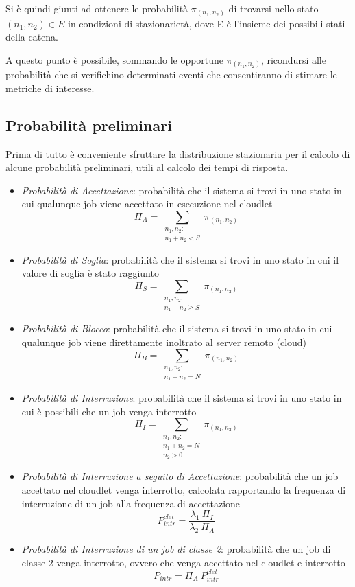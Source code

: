 Si è quindi giunti ad ottenere le probabilità $\pi_{(n_1,n_2)}$ di trovarsi
nello stato $(n_1, n_2) \in E$ in condizioni di stazionarietà, dove E è
l'insieme dei possibili stati della catena.

A questo punto è possibile, sommando le opportune $\pi_{(n_1,n_2)}$, ricondursi
alle probabilità che si verifichino determinati eventi che consentiranno di
stimare le metriche di interesse.
%
%
\subsection{Probabilità preliminari}
Prima di tutto è conveniente sfruttare la distribuzione stazionaria per il
calcolo di alcune probabilità preliminari, utili al calcolo dei tempi di
risposta.
\begin{itemize}
\item \emph{Probabilità di Accettazione}: probabilità che il sistema si trovi in
uno stato in cui qualunque job viene accettato in esecuzione nel cloudlet
\begin{equation}
\Pi_A = \sum_{\substack{n_1,n_2:\\n_1 + n_2 < S}} \pi_{(n_1,n_2)}
\end{equation}
\item \emph{Probabilità di Soglia}: probabilità che il sistema si trovi in uno
stato in cui il valore di soglia è stato raggiunto
\begin{equation}
\Pi_S = \sum_{\substack{n_1,n_2:\\ n_1 + n_2 \geq S}} \pi_{(n_1,n_2)}
\end{equation}
\item \emph{Probabilità di Blocco}: probabilità che il sistema si trovi in uno
stato in cui qualunque job viene direttamente inoltrato al server remoto (cloud)
\begin{equation}
\Pi_B = \sum_{\substack{n_1,n_2:\\n_1 + n_2 = N}} \pi_{(n_1,n_2)}
\end{equation}
\item \emph{Probabilità di Interruzione}: probabilità che il sistema si trovi in
uno stato in cui è possibili che un job venga interrotto
\begin{equation}
\Pi_I = \sum_{\substack{n_1,n_2:\\n_1 + n_2 = N\\n_2 > 0}} \pi_{(n_1,n_2)}
\end{equation}
\item \emph{Probabilità di Interruzione a seguito di Accettazione}: probabilità
che un job accettato nel cloudlet venga interrotto, calcolata rapportando la
frequenza di interruzione di un job alla frequenza di accettazione
\begin{equation}
P_{intr}^{clet} = \frac{\lambda_1 \ \Pi_I}{\lambda_2 \ \Pi_A}
\end{equation}
\item \emph{Probabilità di Interruzione di un job di classe 2}: probabilità
che un job di classe 2 venga interrotto, ovvero che venga accettato nel cloudlet
e interrotto
\begin{equation}
P_{intr} = \Pi_A \ P_{intr}^{clet}
\end{equation}
\end{itemize}
%
